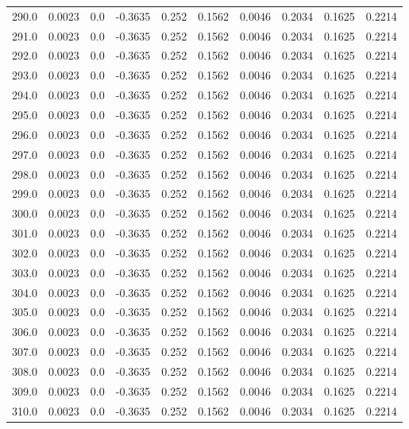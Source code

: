 \begin{longtable}{lrrrrrrrrr}
290.0 & 0.0023 & 0.0 & -0.3635 & 0.252 & 0.1562 & 0.0046 & 0.2034 & 0.1625 & 0.2214 \\
291.0 & 0.0023 & 0.0 & -0.3635 & 0.252 & 0.1562 & 0.0046 & 0.2034 & 0.1625 & 0.2214 \\
292.0 & 0.0023 & 0.0 & -0.3635 & 0.252 & 0.1562 & 0.0046 & 0.2034 & 0.1625 & 0.2214 \\
293.0 & 0.0023 & 0.0 & -0.3635 & 0.252 & 0.1562 & 0.0046 & 0.2034 & 0.1625 & 0.2214 \\
294.0 & 0.0023 & 0.0 & -0.3635 & 0.252 & 0.1562 & 0.0046 & 0.2034 & 0.1625 & 0.2214 \\
295.0 & 0.0023 & 0.0 & -0.3635 & 0.252 & 0.1562 & 0.0046 & 0.2034 & 0.1625 & 0.2214 \\
296.0 & 0.0023 & 0.0 & -0.3635 & 0.252 & 0.1562 & 0.0046 & 0.2034 & 0.1625 & 0.2214 \\
297.0 & 0.0023 & 0.0 & -0.3635 & 0.252 & 0.1562 & 0.0046 & 0.2034 & 0.1625 & 0.2214 \\
298.0 & 0.0023 & 0.0 & -0.3635 & 0.252 & 0.1562 & 0.0046 & 0.2034 & 0.1625 & 0.2214 \\
299.0 & 0.0023 & 0.0 & -0.3635 & 0.252 & 0.1562 & 0.0046 & 0.2034 & 0.1625 & 0.2214 \\
300.0 & 0.0023 & 0.0 & -0.3635 & 0.252 & 0.1562 & 0.0046 & 0.2034 & 0.1625 & 0.2214 \\
301.0 & 0.0023 & 0.0 & -0.3635 & 0.252 & 0.1562 & 0.0046 & 0.2034 & 0.1625 & 0.2214 \\
302.0 & 0.0023 & 0.0 & -0.3635 & 0.252 & 0.1562 & 0.0046 & 0.2034 & 0.1625 & 0.2214 \\
303.0 & 0.0023 & 0.0 & -0.3635 & 0.252 & 0.1562 & 0.0046 & 0.2034 & 0.1625 & 0.2214 \\
304.0 & 0.0023 & 0.0 & -0.3635 & 0.252 & 0.1562 & 0.0046 & 0.2034 & 0.1625 & 0.2214 \\
305.0 & 0.0023 & 0.0 & -0.3635 & 0.252 & 0.1562 & 0.0046 & 0.2034 & 0.1625 & 0.2214 \\
306.0 & 0.0023 & 0.0 & -0.3635 & 0.252 & 0.1562 & 0.0046 & 0.2034 & 0.1625 & 0.2214 \\
307.0 & 0.0023 & 0.0 & -0.3635 & 0.252 & 0.1562 & 0.0046 & 0.2034 & 0.1625 & 0.2214 \\
308.0 & 0.0023 & 0.0 & -0.3635 & 0.252 & 0.1562 & 0.0046 & 0.2034 & 0.1625 & 0.2214 \\
309.0 & 0.0023 & 0.0 & -0.3635 & 0.252 & 0.1562 & 0.0046 & 0.2034 & 0.1625 & 0.2214 \\
310.0 & 0.0023 & 0.0 & -0.3635 & 0.252 & 0.1562 & 0.0046 & 0.2034 & 0.1625 & 0.2214 \\

\end{longtable}
